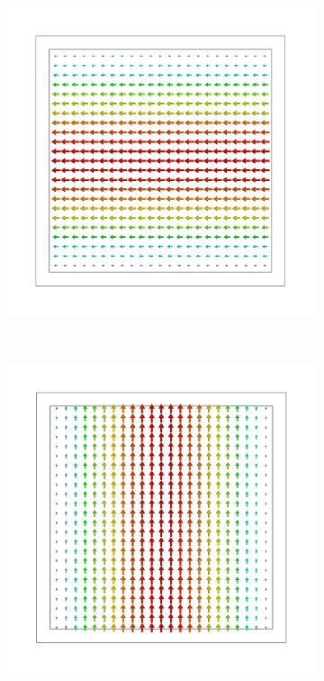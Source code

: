 \documentclass[14pt,a4paper]{ntust_report}
\begin{document}
\begin{figure}
    \centering
    \begin{subfigure}{.45\textwidth}
        \centering
        \includegraphics[width=\textwidth]{src/waveguide_square_mode1.png}
        \caption{\label{fig:square-waveguide-mode1}}
    \end{subfigure}
    ~
    \begin{subfigure}{.45\textwidth}
        \centering
        \includegraphics[width=\textwidth]{src/waveguide_square_mode2.png}

\end{subfigure}
\end{figure}
\end{document}
